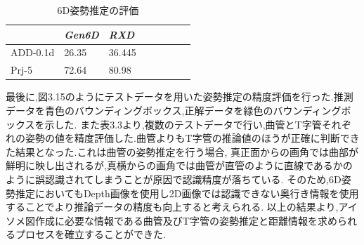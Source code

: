 \begin{table}[htbp]
\centering
\caption{6D姿勢推定の評価}
\begin{tabular}{llllllll}
\hline
\textit{\textbf{}} & \textit{Gen6D} & \textit{RXD} \\ \hline
ADD-0.1d        & 26.35  & 36.445 \\
Prj-5				&	72.64 &	 80.98		\\
\end{tabular}%
\end{table}
最後に,図3.15のようにテストデータを用いた姿勢推定の精度評価を行った.推測データを青色のバウンディングボックス,正解データを緑色のバウンディングボックスを示した.
また表3.3より,複数のテストデータで行い,曲管とT字管それぞれの姿勢の値を精度評価した.曲管よりもT字管の推論値のほうが正確に判断できた結果となった.これは曲管の姿勢推定を行う場合,
真正面からの画角では曲部が鮮明に映し出されるが,真横からの画角では曲管が直管のように直線であるかのように誤認識されてしまうことが原因で認識精度が落ちている.
そのため,6D姿勢推定においてもDepth画像を使用し2D画像では認識できない奥行き情報を使用することでより推論データの精度も向上すると考えられる.
以上の結果より,アイソメ図作成に必要な情報である曲管及びT字管の姿勢推定と距離情報を求められるプロセスを確立することができた.

